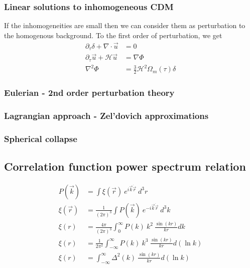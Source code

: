 \documentclass[12pt,twocolumn]{article}
\begin{document}
\subsubsection{Linear solutions to inhomogeneous CDM}
If the inhomogeneities are small then we can consider them as perturbation to the homogenous background. To the first order of perturbation, we get
\begin{align}
\partial_{\tau} \delta + \nabla \cdot \vec{u} &= 0\\
\partial_{\tau} \vec{u} + \mathcal{H} \vec{u} &= \nabla \Phi\\
\nabla^2 \Phi &= \frac{3}{2} \mathcal{H}^2 \Omega_{m}(\tau) \delta
\end{align}


\subsubsection{Eulerian - 2nd order perturbation theory}

\subsubsection{Lagrangian approach - Zel'dovich approximations}

\subsubsection{Spherical collapse}

\subsection{Correlation function power spectrum relation}

\begin{align}
P(\vec{k}) &= \int \xi(\vec{r}) ~e^{i \vec{k} \dot \vec{r}} ~d^3r\\
\xi(\vec{r}) &= \frac{1}{(2\pi)^3} \int P(\vec{k}) ~e^{-i \vec{k} \dot \vec{r}} ~d^3 k\\
\xi(r) &= \frac{4 \pi}{(2\pi)^3} \int_{0}^{\infty} P(k) ~k^2 ~\frac{\sin(kr)}{kr} dk\\
\xi(r) &= \frac{1}{2\pi^2} \int_{-\infty}^{\infty} P(k) ~k^3 ~\frac{\sin(kr)}{kr} d(\ln k)\\
\xi(r) &= \int_{-\infty}^{\infty} \Delta^2(k) ~\frac{\sin(kr)}{kr} d(\ln k)
\end{align}

\end{document}
